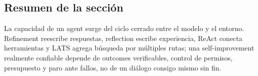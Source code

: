 \subsection{Resumen de la sección}

La capacidad de un agent surge del ciclo cerrado entre el modelo y el entorno. Refinement reescribe respuestas, reflection escribe experiencia, ReAct conecta herramientas y LATS agrega búsqueda por múltiples rutas; una self-improvement realmente confiable depende de outcomes verificables, control de permisos, presupuesto y paro ante fallos, no de un diálogo consigo mismo sin fin.
